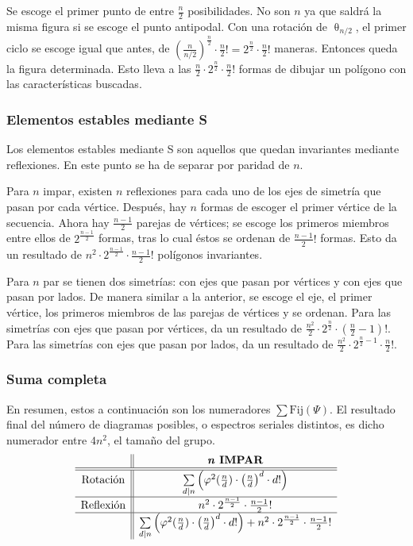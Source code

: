 		Se escoge el primer punto de entre $\frac{n}{2}$ posibilidades. No son $n$ ya que saldrá la misma figura si se escoge el punto antipodal.
		Con una rotación de $\uptheta_{{n}/{2}}$, el primer ciclo se escoge igual que antes, de $\left(\frac{n}{n/2}\right)^{\frac{n}{2}}\cdot \frac{n}{2}!=2^{\frac{n}{2}}\cdot \frac{n}{2}!$ maneras. Entonces queda la figura determinada. Esto lleva a las $\frac{n}{2}\cdot2^{\frac{n}{2}}\cdot\frac{n}{2}!$ formas de dibujar un polígono con las características buscadas.
		
		\subsubsection{Elementos estables mediante S}
		
		Los elementos estables mediante S son aquellos que quedan invariantes mediante reflexiones. En este punto se ha de separar por paridad de $n$. 
		
		Para $n$ impar, existen $n$ reflexiones para cada uno de los ejes de simetría que pasan por cada vértice. Después, hay $n$ formas de escoger el primer vértice de la secuencia. Ahora hay $\frac{n-1}{2}$ parejas de vértices; se escoge los primeros miembros entre ellos de $2^{\frac{n-1}{2}}$ formas, tras lo cual éstos se ordenan de $\frac{n-1}{2}!$ formas. Esto da un resultado de  $n^2\cdot2^{\frac{n-1}{2}}\cdot\frac{n-1}{2}!$ polígonos invariantes.
		
		Para $n$ par se tienen dos simetrías: con ejes que pasan por vértices y con ejes que pasan por lados. De manera similar a la anterior, se escoge el eje, el primer vértice, los primeros miembros de las parejas de vértices y se ordenan. Para las simetrías con ejes que pasan por vértices, da un resultado de  $\frac{n^2}{2}\cdot2^{\frac{n}{2}}\cdot\left(\frac{n}{2}-1\right)!$. Para las simetrías con ejes que pasan por lados, da un resultado de $\frac{n^2}{2}\cdot2^{\frac{n}{2}-1}\cdot\frac{n}{2}!$.
		
		\subsubsection*{Suma completa}
		
		En resumen, estos a continuación son los numeradores $\sum%
		\mbox{Fij}(\Psi)$. El resultado final del número de diagramas posibles, o espectros seriales distintos, es dicho numerador entre $4n^2$, el tamaño del grupo. 	
		\def\arraystretch{1.5}
		\[\begin{array}{c||c}
		&\textbf{\textit{n} IMPAR}\\\hline\hline
		\mbox{Rotación}&\sum\limits_{d|n}\left(\varphi^2(\frac{n}{d})\cdot\left(\frac{n}{d}\right)^d\cdot d!\right)\\\hline
		\mbox{Reflexión}&n^2\cdot2^{\frac{n-1}{2}}\cdot\frac{n-1}{2}!\\\hline
		&\sum\limits_{d|n}\left(\varphi^2(\frac{n}{d})\cdot\left(\frac{n}{d}\right)^d\cdot d!\right)+n^2\cdot2^{\frac{n-1}{2}}\cdot\frac{n-1}{2}!\\
		\end{array}\]
		
